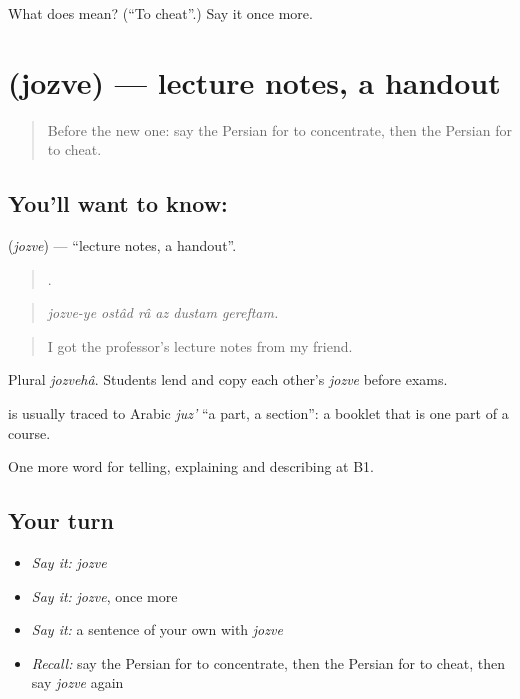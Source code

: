 \begin{tcolorbox}[breakable,colback=teal!4,colframe=teal!35!black,title={Before you move on}]
What does   mean? (\textquotedblleft{}To cheat\textquotedblright{}.) Say it once more.
\end{tcolorbox}
\section[\texorpdfstring{\fa{جزوه} (jozve)}{جزوه (jozve)}]{ (jozve) — lecture notes, a handout}

\label{lesson:FA-C401-jozve}



\begin{quote}
Before the new one: say the Persian for to concentrate, then the Persian for to cheat.
\end{quote}

\subsection*{You'll want to know: }
\textbf{} (\emph{jozve}) — \textquotedblleft{}lecture notes, a handout\textquotedblright{}.

\begin{quote}
     .
\end{quote}

\begin{quote}
\emph{jozve-ye ostâd râ az dustam gereftam.}
\end{quote}

\begin{quote}
I got the professor's lecture notes from my friend.
\end{quote}

Plural \emph{jozvehâ}. Students lend and copy each other's \emph{jozve} before exams.

\begin{cousinweb}
\textbf{} is usually traced to Arabic \emph{juz'} \textquotedblleft{}a part, a section\textquotedblright{}: a booklet that is one part of a course.
\end{cousinweb}

\begin{grammarlens}[title={What you've built}]
One more word for telling, explaining and describing at B1.
\end{grammarlens}

\subsection*{Your turn}
\begin{itemize}
\raggedright
  \item \emph{Say it:} \emph{jozve}
  \item \emph{Say it:} \emph{jozve}, once more
  \item \emph{Say it:} a sentence of your own with \emph{jozve}
  \item \emph{Recall:} say the Persian for to concentrate, then the Persian for to cheat, then say \emph{jozve} again
\end{itemize}


